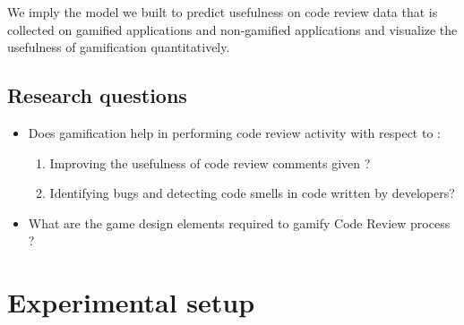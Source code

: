 \documentclass[conference]{IEEEtran}
\begin{document}
We imply the model we built to predict usefulness on code review data that is collected on gamified applications and non-gamified applications and visualize the usefulness of gamification quantitatively.

\subsection{Research questions}
\begin{itemize}
\item Does gamification help in performing code review activity with respect to :
    \begin{enumerate}
    \item Improving the usefulness of code review comments given ?
    \item Identifying bugs and detecting code smells in code written by developers?
    \end{enumerate}
\item What are the game design elements required to gamify Code Review process ?
\end{itemize}




\section{Experimental setup}
\end{document}
